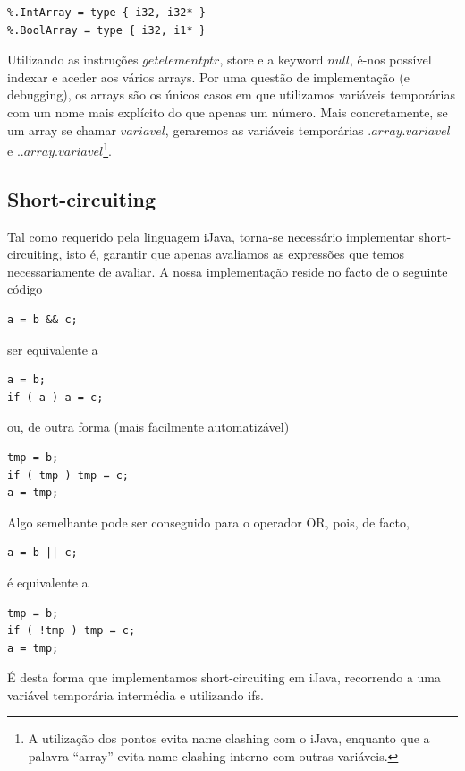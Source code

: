 \documentclass[11pt,a4paper]{article}
\begin{document}
\begin{lstlisting}
%.IntArray = type { i32, i32* }
%.BoolArray = type { i32, i1* }
\end{lstlisting}

Utilizando as instruções $getelementptr$, store e a keyword $null$, é-nos possível indexar e aceder aos vários arrays. Por uma questão de implementação (e debugging), os arrays são os únicos casos em que utilizamos variáveis temporárias com um nome mais explícito do que apenas um número. Mais concretamente, se um array se chamar $variavel$, geraremos as variáveis temporárias $.array.variavel$ e $..array.variavel$\footnote{A utilização dos pontos evita name clashing com o iJava, enquanto que a palavra ``array'' evita name-clashing interno com outras variáveis.}.

\subsection{Short-circuiting}

Tal como requerido pela linguagem iJava, torna-se necessário implementar short-circuiting, isto é, garantir que apenas avaliamos as expressões que temos necessariamente de avaliar. A nossa implementação reside no facto de o seguinte código

\begin{lstlisting}
a = b && c;
\end{lstlisting}

ser equivalente a

\begin{lstlisting}
a = b;
if ( a ) a = c;
\end{lstlisting}

ou, de outra forma (mais facilmente automatizável)

\begin{lstlisting}
tmp = b;
if ( tmp ) tmp = c;
a = tmp;
\end{lstlisting}

Algo semelhante pode ser conseguido para o operador OR, pois, de facto,

\begin{lstlisting}
a = b || c;
\end{lstlisting}

é equivalente a

\begin{lstlisting}
tmp = b;
if ( !tmp ) tmp = c;
a = tmp;
\end{lstlisting}

É desta forma que implementamos short-circuiting em iJava, recorrendo a uma variável temporária intermédia e utilizando ifs. 
\end{document}

